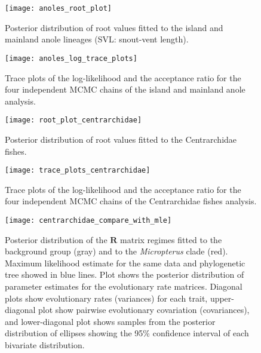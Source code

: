 \begin{figure}[h]
	\centering
	\texttt{[image: anoles\_root\_plot]}
	\caption[Posterior distribution of root values fitted to the island and mainland anole lineages.]{Posterior distribution of root values fitted to the island and mainland anole lineages (SVL: snout-vent length).}
	\label{fig:sup_root_anoles}
\end{figure}

\begin{figure}[h]
	\centering
	\texttt{[image: anoles\_log\_trace\_plots]}
	\caption[Trace plots of the log-likelihood and the acceptance ratio for the four independent MCMC chains of the island and mainland anole analysis.]{Trace plots of the log-likelihood and the acceptance ratio for the four independent MCMC chains of the island and mainland anole analysis. }
	\label{fig:sup_trace_anoles}
\end{figure}

\begin{figure}[h]
	\centering
	\texttt{[image: root\_plot\_centrarchidae]}
	\caption[Posterior distribution of root values fitted to the Centrarchidae fishes.]{Posterior distribution of root values fitted to the Centrarchidae fishes.}
	\label{fig:sup_root_centrarchidae}
\end{figure}

\begin{figure}[h]
	\centering
	\texttt{[image: trace\_plots\_centrarchidae]}
	\caption[Trace plots of the log-likelihood and the acceptance ratio for the four independent MCMC chains of the Centrarchidae fishes analysis.]{Trace plots of the log-likelihood and the acceptance ratio for the four independent MCMC chains of the Centrarchidae fishes analysis. }
	\label{fig:sup_trace_centrarchidae}
\end{figure}

\begin{figure}[h]
	\centering
	\texttt{[image: centrarchidae\_compare\_with\_mle]}
	\caption[Posterior distribution of the $\mathbf{R}$ matrix regimes fitted to the background group and to the \textit{Micropterus} clade.]{Posterior distribution of the $\mathbf{R}$ matrix regimes fitted to the background group (gray) and to the \textit{Micropterus} clade (red). Maximum likelihood estimate for the same data and phylogenetic tree showed in blue lines. Plot shows the posterior distribution of parameter estimates for the evolutionary rate matrices. Diagonal plots show evolutionary rates (variances) for each trait, upper-diagonal plot show pairwise evolutionary covariation (covariances), and lower-diagonal plot shows samples from the posterior distribution of ellipses showing the 95\% confidence interval of each bivariate distribution.}
	\label{fig:centrarchidae_mle}
\end{figure}